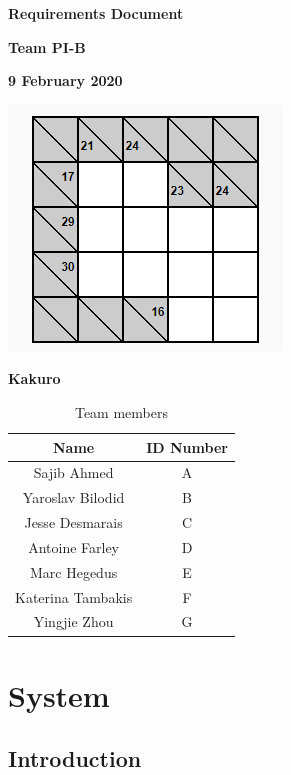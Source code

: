 \documentclass[12pt]{article}
\begin{document}
\graphicspath{{C:/Users/Marc/Desktop/ReqDocFolder/}}

\vspace*{0.5in}
\centerline{\bf\Large Requirements Document}

\vspace*{0.5in}
\centerline{\bf\Large Team PI-B}

\vspace*{0.5in}
\centerline{\bf\Large 9 February 2020}

\vspace*{1.0in}
\centerline{\includegraphics[scale=.75]{KakuroTemp.png}}
\centerline{\bf\Large Kakuro}

\vspace*{0.5in}
\begin{table}[htbp]
\begin{center}
\caption*{Team members}
\begin{tabular}{|c | c|}
\hline
\cellcolor{gray}Name & \cellcolor{gray}ID Number \\
\hline
Sajib Ahmed & A \\
\hline
Yaroslav Bilodid & B \\
\hline
Jesse Desmarais & C \\
\hline
Antoine Farley & D \\
\hline
Marc Hegedus & E \\
\hline
Katerina Tambakis & F \\
\hline
Yingjie Zhou & G \\
\hline
\end{tabular}
\end{center}
\end{table}

\clearpage

\section{System}
\subsection{Introduction}
\end{document}
